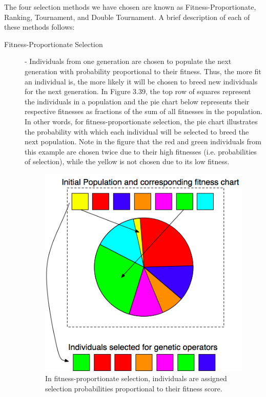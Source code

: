 \documentclass[a4paper,12pt]{report} 	%
\numberwithin{figure}{chapter}
\numberwithin{table}{chapter}
\numberwithin{equation}{chapter}
\begin{document}
\begin{flushleft}
The four selection methods we have chosen are known as Fitness-Proportionate, Ranking, Tournament, and Double Tournament. A brief description of each of these methods follows:
\begin{description}
\item [Fitness-Proportionate Selection] - Individuals from one generation are chosen to populate the next generation with probability proportional to their fitness. Thus, the more fit an individual is, the more likely it will be chosen to breed new individuals for the next generation. In Figure 3.39, the top row of squares represent the individuals in a population and the pie chart below represents their respective fitnesses as fractions of the sum of all fitnesses in the population. In other words, for fitness-proportionate selection, the pie chart illustrates the probability with which each individual will be selected to breed the next population. Note in the figure that the red and green individuals from this example are chosen twice due to their high fitnesses (i.e. probabilities of selection), while the yellow is not chosen due to its low fitness.
\begin{figure}[h!]
\begin{center}
\includegraphics[scale = 0.7]{PieChartSelection}
\caption[Fitness-proportionate Selection]{In fitness-proportionate selection, individuals are assigned selection probabilities proportional to their fitness score.}
\end{center}
\end{figure}

\end{description}
\end{flushleft}
\end{document}
